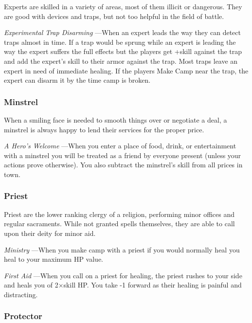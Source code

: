 Experts are skilled in a variety of areas, most of them illicit or dangerous. They are good with devices and traps, but not too helpful in the field of battle.

       

         {\em Experimental Trap Disarming} —When an expert leads the way they can detect traps almost in time. If a trap would be sprung while an expert is leading the way the expert suffers the full effects but the players get +skill against the trap and add the expert's skill to their armor against the trap. Most traps leave an expert in need of immediate healing. If the players Make Camp near the trap, the expert can disarm it by the time camp is broken.

       
\subsubsection{Minstrel}   
       

When a smiling face is needed to smooth things over or negotiate a deal, a minstrel is always happy to lend their services for the proper price.

       

         {\em A Hero's Welcome} —When you enter a place of food, drink, or entertainment with a minstrel you will be treated as a friend by everyone present (unless your actions prove otherwise). You also subtract the minstrel's skill from all prices in town.

       
\subsubsection{Priest}   
       

Priest are the lower ranking clergy of a religion, performing minor offices and regular sacraments. While not granted spells themselves, they are able to call upon their deity for minor aid.

       

         {\em Ministry} —When you make camp with a priest if you would normally heal you heal to your maximum HP value.

       

         {\em First Aid} —When you call on a priest for healing, the priest rushes to your side and heals you of 2×skill HP. You take -1 forward as their healing is painful and distracting.

       
\subsubsection{Protector}   
       

